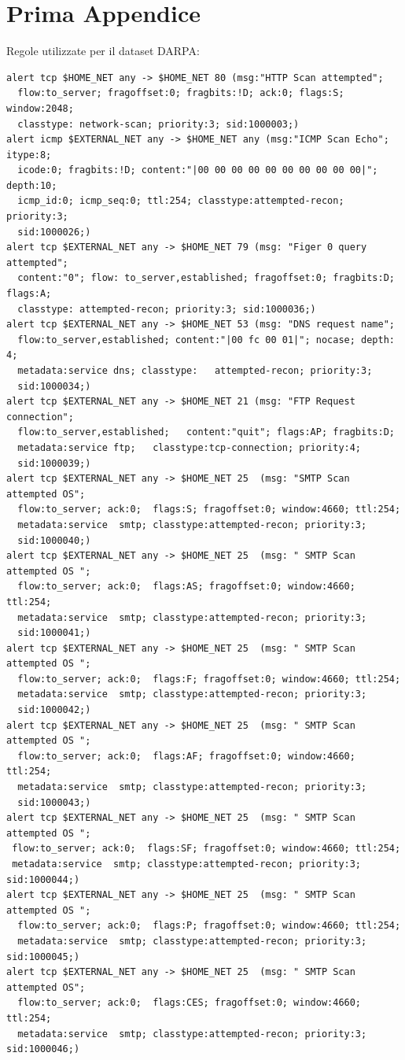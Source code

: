 \documentclass[12pt,a4paper,openright,twoside]{report}
\begin{document}
\chapter{Prima Appendice}               %
Regole utilizzate per il dataset DARPA:
\begin{verbatim}
alert tcp $HOME_NET any -> $HOME_NET 80 (msg:"HTTP Scan attempted";
  flow:to_server; fragoffset:0; fragbits:!D; ack:0; flags:S; window:2048;
  classtype: network-scan; priority:3; sid:1000003;)
alert icmp $EXTERNAL_NET any -> $HOME_NET any (msg:"ICMP Scan Echo"; itype:8;
  icode:0; fragbits:!D; content:"|00 00 00 00 00 00 00 00 00 00|"; depth:10;
  icmp_id:0; icmp_seq:0; ttl:254; classtype:attempted-recon; priority:3;
  sid:1000026;)
alert tcp $EXTERNAL_NET any -> $HOME_NET 79 (msg: "Figer 0 query attempted";
  content:"0"; flow: to_server,established; fragoffset:0; fragbits:D; flags:A;
  classtype: attempted-recon; priority:3; sid:1000036;)
alert tcp $EXTERNAL_NET any -> $HOME_NET 53 (msg: "DNS request name";
  flow:to_server,established; content:"|00 fc 00 01|"; nocase; depth: 4;
  metadata:service dns; classtype:   attempted-recon; priority:3;
  sid:1000034;)
alert tcp $EXTERNAL_NET any -> $HOME_NET 21 (msg: "FTP Request connection";
  flow:to_server,established;   content:"quit"; flags:AP; fragbits:D;
  metadata:service ftp;   classtype:tcp-connection; priority:4;
  sid:1000039;)
alert tcp $EXTERNAL_NET any -> $HOME_NET 25  (msg: "SMTP Scan attempted OS";
  flow:to_server; ack:0;  flags:S; fragoffset:0; window:4660; ttl:254;
  metadata:service  smtp; classtype:attempted-recon; priority:3;
  sid:1000040;)
alert tcp $EXTERNAL_NET any -> $HOME_NET 25  (msg: " SMTP Scan attempted OS ";
  flow:to_server; ack:0;  flags:AS; fragoffset:0; window:4660; ttl:254;
  metadata:service  smtp; classtype:attempted-recon; priority:3;
  sid:1000041;)
alert tcp $EXTERNAL_NET any -> $HOME_NET 25  (msg: " SMTP Scan attempted OS ";
  flow:to_server; ack:0;  flags:F; fragoffset:0; window:4660; ttl:254;
  metadata:service  smtp; classtype:attempted-recon; priority:3;
  sid:1000042;)
alert tcp $EXTERNAL_NET any -> $HOME_NET 25  (msg: " SMTP Scan attempted OS ";
  flow:to_server; ack:0;  flags:AF; fragoffset:0; window:4660; ttl:254;
  metadata:service  smtp; classtype:attempted-recon; priority:3;
  sid:1000043;)
alert tcp $EXTERNAL_NET any -> $HOME_NET 25  (msg: " SMTP Scan attempted OS ";
 flow:to_server; ack:0;  flags:SF; fragoffset:0; window:4660; ttl:254;
 metadata:service  smtp; classtype:attempted-recon; priority:3; sid:1000044;)
alert tcp $EXTERNAL_NET any -> $HOME_NET 25  (msg: " SMTP Scan attempted OS ";
  flow:to_server; ack:0;  flags:P; fragoffset:0; window:4660; ttl:254;
  metadata:service  smtp; classtype:attempted-recon; priority:3; sid:1000045;)
alert tcp $EXTERNAL_NET any -> $HOME_NET 25  (msg: " SMTP Scan attempted OS";
  flow:to_server; ack:0;  flags:CES; fragoffset:0; window:4660; ttl:254;
  metadata:service  smtp; classtype:attempted-recon; priority:3; sid:1000046;)
\end{verbatim}\label{app:regole-DARPA}
\end{document}

